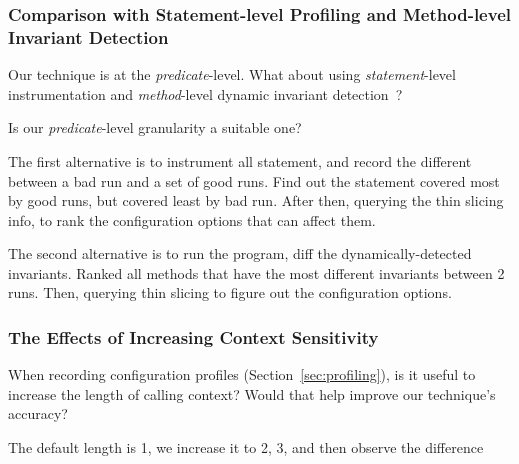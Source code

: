 \subsubsection{Comparison with Statement-level Profiling and Method-level Invariant Detection}

Our technique is at the \textit{predicate}-level. What about using
\textit{statement}-level instrumentation and \textit{method}-level dynamic invariant detection~\cite{Ernst:1999}?

Is our \textit{predicate}-level granularity a suitable one?

The first alternative is to instrument all statement, and record the different between a bad run and
a set of good runs. Find out the statement covered most by good runs, but covered least by bad run.
After then, querying the thin slicing info, to rank the configuration options that can affect them.


The second alternative is to run the program, diff the dynamically-detected invariants. Ranked all
methods that have the most different invariants between 2 runs. Then, querying thin slicing to
figure out the configuration options.

\subsubsection{The Effects of Increasing Context Sensitivity}

When recording configuration profiles (Section~\ref{sec:profiling}), is it useful
to increase the length of calling context? Would that help improve our technique's accuracy?

The default length is 1, we increase it to 2, 3, and then observe the difference
